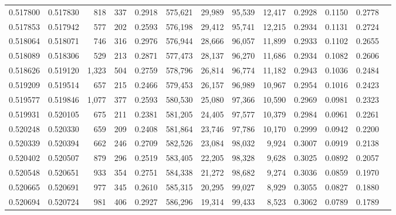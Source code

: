 \begin{tabular}{rrrrrrrrrrrrr}
0.517800 & 0.517830 &    818 &   337 &                                     0.2918 & 575,621 &  29,989 &  95,539 &  12,417 & 0.2928 & 0.1150 & 0.2778 \\
0.517853 & 0.517942 &    577 &   202 &                                     0.2593 & 576,198 &  29,412 &  95,741 &  12,215 & 0.2934 & 0.1131 & 0.2724 \\
0.518064 & 0.518071 &    746 &   316 &                                     0.2976 & 576,944 &  28,666 &  96,057 &  11,899 & 0.2933 & 0.1102 & 0.2655 \\
0.518089 & 0.518306 &    529 &   213 &                                     0.2871 & 577,473 &  28,137 &  96,270 &  11,686 & 0.2934 & 0.1082 & 0.2606 \\
0.518626 & 0.519120 &  1,323 &   504 &                                     0.2759 & 578,796 &  26,814 &  96,774 &  11,182 & 0.2943 & 0.1036 & 0.2484 \\
0.519209 & 0.519514 &    657 &   215 &                                     0.2466 & 579,453 &  26,157 &  96,989 &  10,967 & 0.2954 & 0.1016 & 0.2423 \\
0.519577 & 0.519846 &  1,077 &   377 &                                     0.2593 & 580,530 &  25,080 &  97,366 &  10,590 & 0.2969 & 0.0981 & 0.2323 \\
0.519931 & 0.520105 &    675 &   211 &                                     0.2381 & 581,205 &  24,405 &  97,577 &  10,379 & 0.2984 & 0.0961 & 0.2261 \\
0.520248 & 0.520330 &    659 &   209 &                                     0.2408 & 581,864 &  23,746 &  97,786 &  10,170 & 0.2999 & 0.0942 & 0.2200 \\
0.520339 & 0.520394 &    662 &   246 &                                     0.2709 & 582,526 &  23,084 &  98,032 &   9,924 & 0.3007 & 0.0919 & 0.2138 \\
0.520402 & 0.520507 &    879 &   296 &                                     0.2519 & 583,405 &  22,205 &  98,328 &   9,628 & 0.3025 & 0.0892 & 0.2057 \\
0.520548 & 0.520651 &    933 &   354 &                                     0.2751 & 584,338 &  21,272 &  98,682 &   9,274 & 0.3036 & 0.0859 & 0.1970 \\
0.520665 & 0.520691 &    977 &   345 &                                     0.2610 & 585,315 &  20,295 &  99,027 &   8,929 & 0.3055 & 0.0827 & 0.1880 \\
0.520694 & 0.520724 &    981 &   406 &                                     0.2927 & 586,296 &  19,314 &  99,433 &   8,523 & 0.3062 & 0.0789 & 0.1789 \\

\end{tabular}
